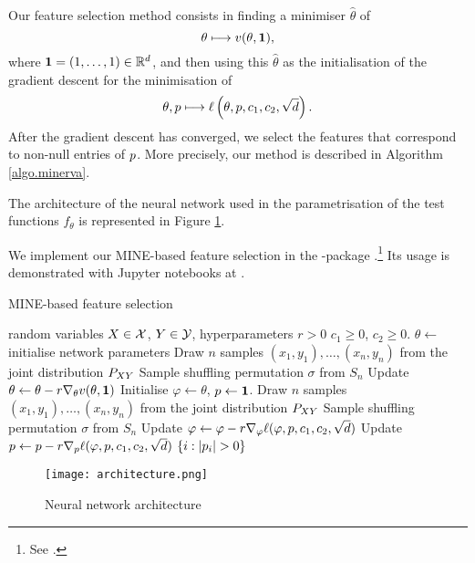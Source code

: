 Our feature selection method
consists in
finding a minimiser 
$\hat{\theta}$ of 
\begin{equation*}
\theta \longmapsto {v}(\theta, \mathbf{1}),
\end{equation*}
where $\mathbf{1} = (1, \dots, 1) \in \mathbb{R}^{d}$,
and then using this $\hat{\theta}$
as the initialisation of the gradient descent 
for the minimisation of 
\begin{equation*}
	\theta, {p} \longmapsto {\ell}\left(\theta, {p}, c_1, c_2, \sqrt{d}\right).
\end{equation*}
After the gradient descent has converged,
we select the features that correspond to non-null entries of ${p}$.
More precisely, our method is described in Algorithm \ref{algo.minerva}.

The architecture 
of 
the neural network 
used in 
the parametrisation  of the test functions 
$f_\theta$
is represented in 
Figure
\ref{fig.networkarchitecture}.

We implement our MINE-based feature selection in the 
-package 
.\footnote{
	See
	.
}
Its usage is demonstrated 
with Jupyter notebooks
at
.

\begin{algorithm}
	\caption{MINE-based feature selection}
	\label{algo.minerva}
	\begin{algorithmic}[1]
		\REQUIRE
		random variables
		$X\in \mathcal{X}$,
		$Y\in \mathcal{Y}$,
		hyperparameters
		$r>0$
		$c_1\geq 0$, $c_2\geq 0$.
		\STATE $\theta \leftarrow$ initialise network parameters
		\REPEAT
		\STATE Draw $n$ samples $(x_1, y_1), \dots, (x_n, y_n)$ from the joint distribution ${{P}}_{XY}$
		\STATE Sample shuffling permutation $\sigma$ from $S_n$
		\STATE Update $\theta \leftarrow \theta - r\nabla_{\theta}{v}(\theta, \mathbf{1})$%
		\STATE Initialise $\varphi \leftarrow \theta$, ${p} \leftarrow \mathbf{1}$.
		\REPEAT
		\STATE Draw $n$ samples $(x_1, y_1), \dots, (x_n, y_n)$ from the joint distribution ${{P}}_{XY}$
		\STATE Sample shuffling permutation $\sigma$ from $S_n$
		\STATE Update $\varphi \leftarrow \varphi - r \nabla_{\varphi}{\ell}(\varphi, {p}, c_1, c_2, \sqrt{d})$
		\STATE Update ${p} \leftarrow {p} - r \nabla_{{p}}{\ell}(\varphi, {p}, c_1, c_2, \sqrt{d})$
		\RETURN $\left\lbrace i: \left\lvert {{p}_i} \right\rvert > 0\right\rbrace$
	\end{algorithmic}
\end{algorithm}

\begin{figure}
	\caption{Neural network architecture}
	\label{fig.networkarchitecture}
	\texttt{[image: architecture.png]}
\end{figure}





